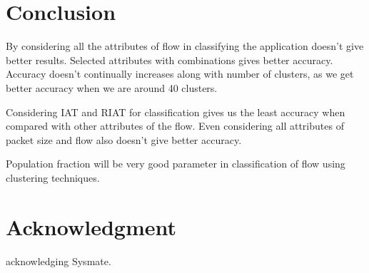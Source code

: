 \documentclass[conference]{IEEEtran}
\begin{document}
\section{Conclusion}
By considering all the attributes of flow in classifying the application doesn't give better results. Selected attributes with combinations gives better accuracy. Accuracy doesn't continually increases along with number of clusters, as we get better accuracy when we are around 40 clusters. 

Considering IAT and RIAT for classification gives us the least accuracy when compared with other attributes of the flow. Even considering all attributes of packet size and flow also doesn't give better accuracy. 

Population fraction will be very good parameter in classification of flow using clustering techniques. 




\section*{Acknowledgment}
acknowledging Sysmate.








%






\end{document}
